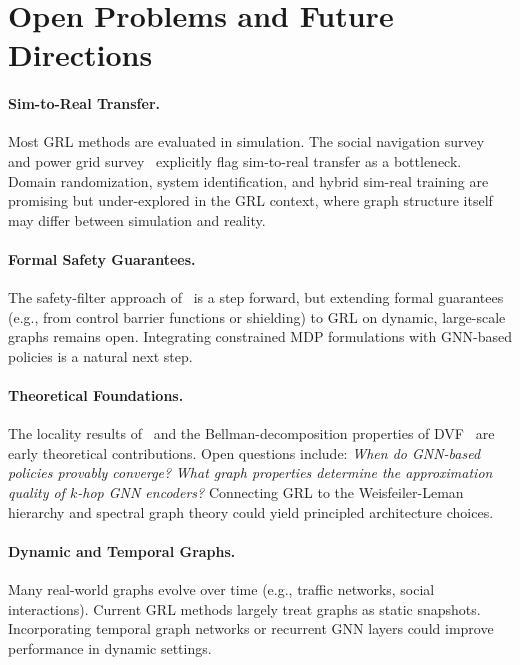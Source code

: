 \documentclass{article}
\begin{document}
\section{Open Problems and Future Directions}\label{sec:future}

\paragraph{Sim-to-Real Transfer.}
Most GRL methods are evaluated in simulation. The social navigation survey~\cite{social_nav2025} and power grid survey~\cite{grl_power2025} explicitly flag sim-to-real transfer as a bottleneck. Domain randomization, system identification, and hybrid sim-real training are promising but under-explored in the GRL context, where graph structure itself may differ between simulation and reality.

\paragraph{Formal Safety Guarantees.}
The safety-filter approach of~\cite{safe_explore2025} is a step forward, but extending formal guarantees (e.g., from control barrier functions or shielding) to GRL on dynamic, large-scale graphs remains open. Integrating constrained MDP formulations with GNN-based policies is a natural next step.

\paragraph{Theoretical Foundations.}
The locality results of~\cite{mfc_sparse2026} and the Bellman-decomposition properties of DVF~\cite{dvf2026} are early theoretical contributions. Open questions include: \emph{When do GNN-based policies provably converge?} \emph{What graph properties determine the approximation quality of $k$-hop GNN encoders?} Connecting GRL to the Weisfeiler-Leman hierarchy and spectral graph theory could yield principled architecture choices.

\paragraph{Dynamic and Temporal Graphs.}
Many real-world graphs evolve over time (e.g., traffic networks, social interactions). Current GRL methods largely treat graphs as static snapshots. Incorporating temporal graph networks or recurrent GNN layers could improve performance in dynamic settings.
\end{document}

